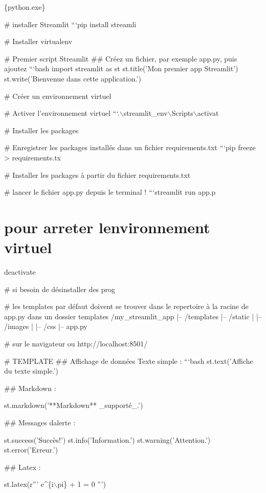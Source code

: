 
\begin{DoxyCode}
\{python.exe\}

#  installer Streamlit
```pip install streamli
\end{DoxyCode}


\# Installer virtualenv 
\begin{DoxyCode}
# Premier script Streamlit
## Créez un fichier, par exemple app.py, puis ajoutez
```bash
import streamlit as st
st.title('Mon premier app Streamlit')
st.write('Bienvenue dans cette application.')
\end{DoxyCode}


\# Créer un environnement virtuel 
\begin{DoxyCode}
# Activer l'environnement virtuel
```.\(\backslash\)streamlit\_env\(\backslash\)Scripts\(\backslash\)activat
\end{DoxyCode}


\# Installer les packages 
\begin{DoxyCode}
# Enregistrer les packages installés dans un fichier requirements.txt
```pip freeze > requirements.tx
\end{DoxyCode}


\# Installer les packages à partir du fichier requirements.\+txt 
\begin{DoxyCode}
# lancer le fichier app.py depuis le terminal !
```streamlit run app.p
\end{DoxyCode}
 \section*{pour arreter l\textquotesingle{}environnement virtuel}

deactivate

\# si besoin de désinstaller des prog 
\begin{DoxyCode}
#  les templates par défaut doivent se trouver dans le repertoire à la racine de app.py dans un dossier
       templates
/my\_streamlit\_app
|-- /templates
|-- /static
|   |-- /images
|   |-- /css
|-- app.py

# sur le navigateur ou http://localhost:8501/


# TEMPLATE
## Affichage de données
Texte simple :
```bash
st.text('Affiche du texte simple.')
\end{DoxyCode}
 \#\# Markdown \+: 
\begin{DoxyCode}
st.markdown('**Markdown** \_supporté\_.')
\end{DoxyCode}
 \#\# Messages d\textquotesingle{}alerte \+: 
\begin{DoxyCode}
st.success('Succès!')
st.info('Information.')
st.warning('Attention.')
st.error('Erreur.')
\end{DoxyCode}
 \#\# Latex \+: 
\begin{DoxyCode}
st.latex(r''' e^\{i\(\backslash\)pi\} + 1 = 0 ''')
\end{DoxyCode}

